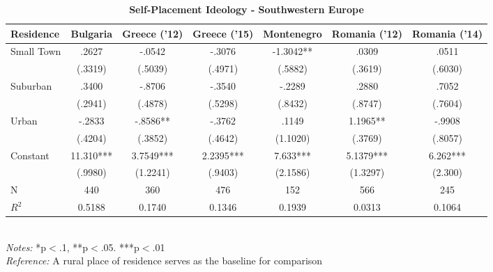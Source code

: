 \documentclass[12pt, titlepage]{article}
\newcommand\e{\emph}
\newcommand\tb{\textbf}
\begin{document}
\begin{landscape}
	\begin{table}
		\centering
		\def\arraystretch{1.5}
		\caption{\tb{Self-Placement Ideology - Southwestern Europe}}
		\begin{tabulary}{\linewidth}{l c c c c c c}

			\hline
			\tb{Residence}& \tb{Bulgaria}& \tb{Greece ('12)}& \tb{Greece ('15)} & \tb{Montenegro} & \tb{Romania ('12)} & \tb {Romania ('14)}\\
			\hline
			Small Town&.2627 &-.0542 &-.3076 & -1.3042** & .0309 & .0511\\
			&(.3319)& (.5039) & (.4971) & (.5882) & (.3619) & (.6030)\\
			Suburban& .3400 & -.8706 &-.3540 & -.2289  &.2880 &.7052\\
			& (.2941) &(.4878) & (.5298) & (.8432) & (.8747) & (.7604)\\
			Urban& -.2833& -.8586** & -.3762 & .1149& 1.1965** & -.9908\\
			& (.4204)& (.3852) & (.4642) & (1.1020) & (.3769) & (.8057)\\
			Constant& 11.310*** &3.7549*** & 2.2395*** &7.633*** & 5.1379*** & 6.262***\\
			& (.9980) & (1.2241)  & (.9403) & (2.1586)& (1.3297) & (2.300)\\
			N& 440 & 360 & 476 & 152 & 566 &245\\
			$R^2$&0.5188 &0.1740& 0.1346 &0.1939& 0.0313 &0.1064 \\
			\hline
		\end{tabulary}
		\\
		\e{Notes:} *p$<$.1, **p$<$.05. ***p$<$.01 \\
		\e{Reference:} A rural place of residence serves as the baseline for comparison
		\label{table8}
	\end{table}
\end{landscape}
\end{document}
